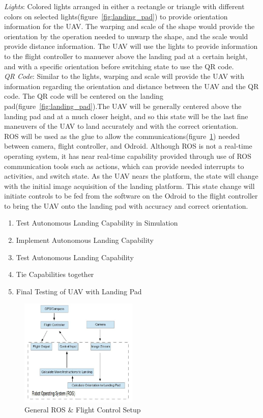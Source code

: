 \documentclass[11pt]{article}
\begin{document}
\noindent \textit{Lights}: Colored lights arranged in either a rectangle or triangle with different colors on selected lights(figure~\ref{fig:landing_pad}) to provide orientation information for the UAV. The warping and scale of the shape would provide the orientation by the operation needed to unwarp the shape, and the scale would provide distance information. The UAV will use the lights to provide information to the flight controller to manuever above the landing pad at a certain height, and with a specific orientation before switching state to use the QR code.\\

\noindent \textit{QR Code}: Similar to the lights, warping and scale will provide the UAV with information regarding the orientation and distance between the UAV and the QR code. The QR code will be centered on the landing pad(figure~\ref{fig:landing_pad}).The UAV will be generally centered above the landing pad and at a much closer height, and so this state will be the last fine maneuvers of the UAV to land accurately and with the correct orientation.\\

\noindent ROS will be used as the glue to allow the communications(figure~\ref{fig:ROS}) needed between camera, flight controller, and Odroid. Although ROS is not a real-time operating system, it has near real-time capability provided through use of ROS communication tools such as actions, which can provide needed interrupts to activities, and switch state. As the UAV nears the platform, the state will change with the initial image acquisition of the landing platform. This state change will initiate controls to be fed from the software on the Odroid to the flight controller to bring the UAV onto the landing pad with accuracy and correct orientation. 
\begin{enumerate}
\item Test Autonomous Landing Capability in Simulation
\item Implement Autonomous Landing Capability
\item Test Autonomous Landing Capability
\item Tie Capabilities together
\item Final Testing of UAV with Landing Pad
\end{enumerate}

\begin{figure}[h]
\centering
\includegraphics[width=0.5\textwidth]{UAV_Control_1}
\caption{General ROS \& Flight Control Setup}
\label{fig:ROS}
\end{figure}
\end{document}
